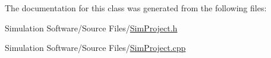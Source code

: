 The documentation for this class was generated from the following files\+:\begin{DoxyCompactItemize}
\item 
Simulation Software/\+Source Files/\hyperlink{_sim_project_8h}{Sim\+Project.\+h}\item 
Simulation Software/\+Source Files/\hyperlink{_sim_project_8cpp}{Sim\+Project.\+cpp}\end{DoxyCompactItemize}
